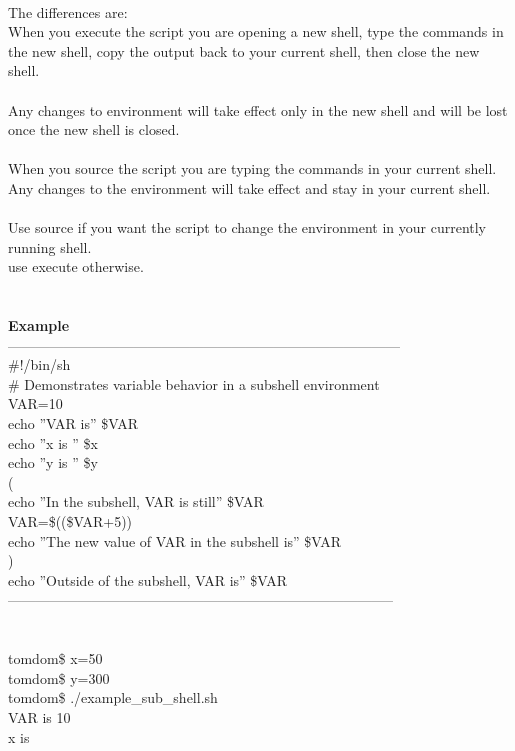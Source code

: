 \documentclass[10pt,a4paper]{article}
\begin{document}
{{{{{{{{{{{{{{\\
The differences are:\\
When you execute the script you are opening a new shell, type the commands in the new shell, copy the output back to your current shell, then close the new shell. \\
\\
Any changes to environment will take effect only in the new shell and will be lost once the new shell is closed.\\
\\
When you source the script you are typing the commands in your current shell. \\
Any changes to the environment will take effect and stay in your current shell. \\
\\
Use source if you want the script to change the environment in your currently running shell.\\
use execute otherwise.\\
\\
\\
\textbf{Example}}{\large \\
------------------------------------------------------------------------------------\\
\#!/bin/sh\\
\# Demonstrates variable behavior in a subshell environment\\
VAR=10\\
echo ''VAR is'' \$VAR\\
echo ''x is '' \$x\\
echo ''y is '' \$y\\
(\\
echo ''In the subshell, VAR is still'' \$VAR\\
VAR=\$((\$VAR+5))\\
echo ''The new value of VAR in the subshell is'' \$VAR\\
)\\
echo ''Outside of the subshell, VAR is'' \$VAR\\
-----------------------------------------------------------------------------------\\
\\
\\
tomdom\$ x=50\\
tomdom\$ y=300\\
tomdom\$ ./example\_sub\_shell.sh\\
VAR is 10\\
x is \\
}}}}}}}}}}}}}}
\end{document}

